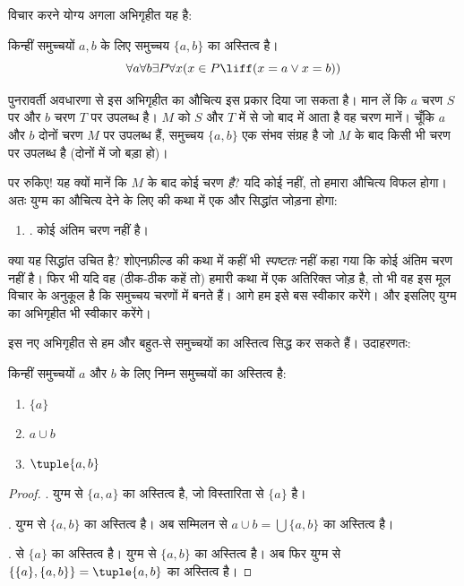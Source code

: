\documentclass[../../../include/open-logic-section]{subfiles}
\begin{document}

विचार करने योग्य अगला अभिगृहीत यह है:

\begin{axiom}[युग्म]
किन्हीं समुच्चयों $a, b$ के लिए समुच्चय $\{a, b\}$ का अस्तित्व है।
\[
	\forall a \forall b \exists P \forall x (x \in P \liff (x = a \lor x = b))
\]
\end{axiom}

पुनरावर्ती अवधारणा से इस अभिगृहीत का औचित्य इस प्रकार दिया जा सकता है।
मान लें कि $a$ चरण $S$ पर और $b$ चरण $T$ पर उपलब्ध है। $M$ को $S$ और
$T$ में से जो बाद में आता है वह चरण मानें। चूँकि $a$ और $b$ दोनों चरण $M$
पर उपलब्ध हैं, समुच्चय $\{a,b\}$ एक संभव संग्रह है जो $M$ के बाद किसी भी
चरण पर उपलब्ध है (दोनों में जो बड़ा हो)।

पर रुकिए!{} यह क्यों मानें कि $M$ के बाद कोई चरण \emph{है}? यदि कोई नहीं,
तो हमारा औचित्य विफल होगा। अतः युग्म का औचित्य देने के लिए
 की कथा में एक और सिद्धांत जोड़ना होगा:
\begin{enumerate}
	\item[] \stagessucc. कोई अंतिम चरण नहीं है।
\end{enumerate}
क्या यह सिद्धांत उचित है? शोएनफ़ील्ड की कथा में कहीं भी \emph{स्पष्टतः}
नहीं कहा गया कि कोई अंतिम चरण नहीं है। फिर भी यदि वह (ठीक-ठीक कहें तो)
हमारी कथा में एक अतिरिक्त जोड़ है, तो भी वह इस मूल विचार के अनुकूल है कि
समुच्चय चरणों में बनते हैं। आगे हम इसे बस स्वीकार करेंगे। और इसलिए युग्म का
अभिगृहीत भी स्वीकार करेंगे।

इस नए अभिगृहीत से हम और बहुत-से समुच्चयों का अस्तित्व सिद्ध कर सकते हैं।
उदाहरणतः:

\begin{prop}
किन्हीं समुच्चयों $a$ और $b$ के लिए निम्न समुच्चयों का अस्तित्व है:
	\begin{enumerate}
		\item{} $\{a\}$
		\item{} $a \cup b$
		\item{} $\tuple{a, b}$
	\end{enumerate}
\end{prop}

\begin{proof}
. युग्म से $\{a, a\}$ का अस्तित्व है, जो विस्तारिता से
$\{a\}$ है।

. युग्म से $\{a, b\}$ का अस्तित्व है। अब सम्मिलन से
$a \cup b = \bigcup \{a, b\}$ का अस्तित्व है।

.  से $\{a\}$ का अस्तित्व है। युग्म से
$\{a, b\}$ का अस्तित्व है। अब फिर युग्म से
$\{\{a\}, \{a, b\}\} = \tuple{a, b}$ का अस्तित्व है।
\end{proof}
\end{document}
